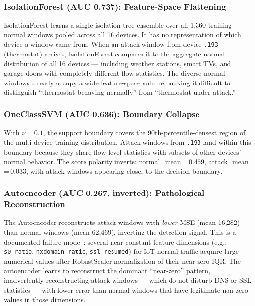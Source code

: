 \documentclass[journal,10pt,twoside]{IEEEtran}
\begin{document}
\subsubsection{IsolationForest (AUC 0.737): Feature-Space Flattening}
IsolationForest learns a single isolation tree ensemble over all 1{,}360
training normal windows pooled across all 16 devices.
It has no representation of which device a window came from.
When an attack window from device \texttt{.193} (thermostat) arrives,
IsolationForest compares it to the aggregate normal distribution of all 16
devices --- including weather stations, smart TVs, and garage doors with
completely different flow statistics.
The diverse normal windows already occupy a wide feature-space volume,
making it difficult to distinguish ``thermostat behaving normally'' from
``thermostat under attack.''

\subsubsection{OneClassSVM (AUC 0.636): Boundary Collapse}
With $\nu=0.1$, the support boundary covers the 90th-percentile-densest region
of the multi-device training distribution.
Attack windows from \texttt{.193} land within this boundary because they share
flow-level statistics with subsets of other devices' normal behavior.
The score polarity inverts: normal\_mean\,=\,0.469, attack\_mean\,=\,0.033,
with attack windows appearing closer to the decision boundary.

\subsubsection{Autoencoder (AUC 0.267, inverted): Pathological Reconstruction}
The Autoencoder reconstructs attack windows with \emph{lower} MSE
(mean 16{,}282) than normal windows (mean 62{,}469), inverting the detection
signal.
This is a documented failure mode~\cite{gong2019memorize}: several
near-constant feature dimensions (e.g., \texttt{s0\_ratio},
\texttt{nxdomain\_ratio}, \texttt{ssl\_resumed}) for IoT normal traffic acquire
large numerical values after RobustScaler normalization of their near-zero IQR.
The autoencoder learns to reconstruct the dominant ``near-zero'' pattern,
inadvertently reconstructing attack windows --- which do not disturb DNS or SSL
statistics --- with lower error than normal windows that have legitimate
non-zero values in those dimensions.
\end{document}
